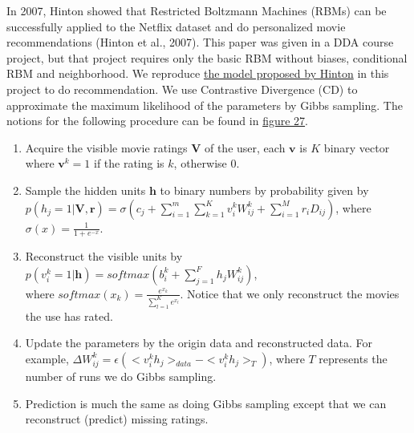 \begin{CJK*}{UTF8}{gbsn}
In 2007, Hinton showed that Restricted Boltzmann Machines (RBMs) can be successfully applied to the Netflix dataset and do personalized movie recommendations (Hinton et al., 2007). This paper was given in a DDA course project, but that project requires only the basic RBM without biases, conditional RBM and neighborhood. We reproduce \hyperref[RBM]{the model proposed by Hinton} in this project to do recommendation. We use Contrastive Divergence (CD) to approximate the maximum likelihood of the parameters by Gibbs sampling. The notions for the following procedure can be found in \href{rbm}{figure 27}.
\begin{enumerate}
    \item Acquire the visible movie ratings $ \bm{V} $ of the user, each $ \bm{v} $ is $ K $ binary vector where $ \bm{v}^k = 1 $ if the rating is $ k $, otherwise 0.
    \item Sample the hidden units $ \bm{h} $ to binary numbers by probability given by \\ $ p(h_j = 1 | \bm{V}, \bm{r}) = \sigma(c_j + \sum_{i = 1}^m \sum_{k = 1}^K v_i^k W_{ij}^k + \sum_{i = 1}^M r_i D_{ij}) $, where $ \sigma(x) = \frac{1}{1 + e^{-x}}  $.
    \item Reconstruct the visible units by $ p(v_i^k = 1 | \bm{h}) = softmax(b_i^k + \sum_{j = 1}^F h_j W_{ij}^k) $, \\where $ softmax(x_k) = \frac{e^{x_k}}{\sum_{l= 1}^K e^{x_l}} $. Notice that we only reconstruct the movies the use has rated.
    \item Update the parameters by the origin data and reconstructed data. For example, $ \Delta W_{ij}^k = \epsilon (<v_i^k h_j>_{data} - <v_i^k h_j>_T) $, where $ T $ represents the number of runs we do Gibbs sampling.
    \item Prediction is much the same as doing Gibbs sampling except that we can reconstruct (predict) missing ratings.
\end{enumerate}


\end{CJK*}
